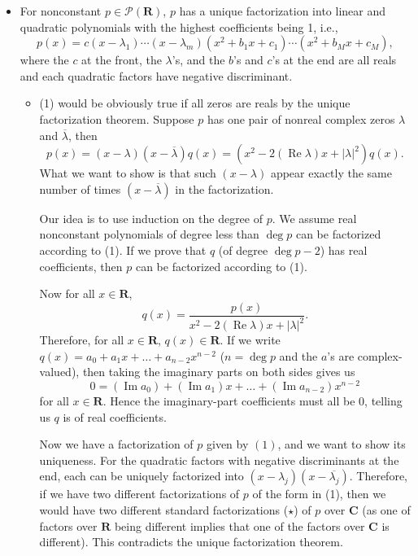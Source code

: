 \documentclass{article}
\newcommand{\R}{\mathbf{R}}
\newcommand{\C}{\mathbf{C}}
\renewcommand{\Re}{\operatorname{Re}}
\renewcommand{\Im}{\operatorname{Im}}
\newcommand{\conj}[1]{\overline{#1}}
\begin{document}
\begin{itemize}
    \item For nonconstant $p \in \mathcal{P}(\R)$, $p$ has a unique factorization into linear and quadratic polynomials with the highest coefficients being 1, i.e.,
    \begin{equation}
        p(x)=c(x-\lambda_1)\cdots(x-\lambda_m)(x^2+b_1x+c_1)\cdots(x^2+b_Mx+c_M),
    \end{equation} where the $c$ at the front, the $\lambda$'s, and the $b$'s and $c$'s at the end are all reals and each quadratic factors have negative discriminant.
    \begin{itemize}
        \item (1) would be obviously true if all zeros are reals by the unique factorization theorem. Suppose $p$ has one pair of nonreal complex zeros $\lambda$ and $\conj{\lambda}$, then $$p(x) = (x-\lambda)(x-\conj{\lambda})q(x) = (x^2-2(\Re{\lambda})x+|\lambda|^2)q(x).$$ What we want to show is that such $(x - \lambda)$ appear exactly the same number of times $(x - \conj{\lambda})$ in the factorization.
        
        Our idea is to use induction on the degree of $p$. We assume real nonconstant polynomials of degree less than $\deg p$ can be factorized according to (1). If we prove that $q$ (of degree $\deg p-2$) has real coefficients, then $p$ can be factorized according to (1).
        
        Now for all $x \in \R$, $$q(x) = \frac{p(x)}{x^2-2(\Re{\lambda})x+|\lambda|^2}.$$ Therefore, for all $x \in \R$, $q(x) \in \R$. If we write $q(x) = a_0+a_1x+\dots+a_{n-2}x^{n-2}$ ($n = \deg p$ and the $a$'s are complex-valued), then taking the imaginary parts on both sides gives us $$0 = (\Im a_0)+(\Im a_1)x+\dots+(\Im a_{n-2})x^{n-2}$$ for all $x \in \R$. Hence the imaginary-part coefficients must all be $0$, telling us $q$ is of real coefficients.
        
        Now we have a factorization of $p$ given by $(1)$, and we want to show its uniqueness. For the quadratic factors with negative discriminants at the end, each can be uniquely factorized into $(x-\lambda_j)(x-\conj{\lambda_j})$. Therefore, if we have two different factorizations of $p$ of the form in (1), then we would have two different standard factorizations ($\star$) of $p$ over $\C$ (as one of factors over $\R$ being different implies that one of the factors over $\C$ is different). This contradicts the unique factorization theorem.
    \end{itemize}
\end{itemize}
\end{document}
